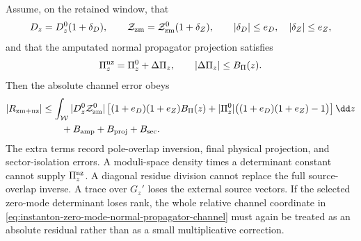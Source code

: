 \begin{controlledapproximation}
Assume, on the retained window, that
\[
  D_z=D_z^0(1+\delta_D),\qquad
  \mathcal Z_{\rm zm}=\mathcal Z_{\rm zm}^0(1+\delta_Z),
  \qquad
  |\delta_D|\le e_D,\quad |\delta_Z|\le e_Z,
\]
and that the amputated normal propagator projection satisfies
\[
  \Pi_z^{\rm nz}
  =
  \Pi_z^{0}+\Delta\Pi_z,\qquad
  |\Delta\Pi_z|\le B_\Pi(z).
\]
Then the absolute channel error obeys
\begin{equation}
\begin{aligned}
  |R_{\rm zm+nz}|
  &\le
  \int_{\mathcal W}
  |D_z^0\mathcal Z_{\rm zm}^0|
  \left[
    (1+e_D)(1+e_Z)B_\Pi(z)
    +|\Pi_z^0|
      \bigl((1+e_D)(1+e_Z)-1\bigr)
  \right]\dd z                                      \\
  &\qquad{}+B_{\rm amp}+B_{\rm proj}+B_{\rm sec}.
  \label{eq:instanton-normal-propagator-channel-bound}
\end{aligned}
\end{equation}
The extra terms record pole-overlap inversion, final physical projection, and
sector-isolation errors.  A moduli-space density times a determinant constant
cannot supply \(\Pi_z^{\rm nz}\).  A diagonal residue division cannot replace
the full source-overlap inverse.  A trace over \(G_z'\) loses the external
source vectors.  If the selected zero-mode determinant loses rank, the whole
relative channel coordinate in
\eqref{eq:instanton-zero-mode-normal-propagator-channel} must again be
treated as an absolute residual rather than as a small multiplicative
correction.
\end{controlledapproximation}

